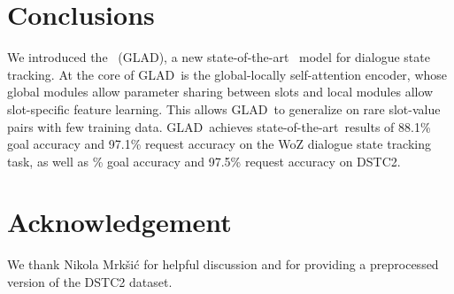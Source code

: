 \documentclass[11pt,a4paper]{article}
\newcommand{\modelnameshort}{GLAD}
\newcommand{\sota}{state-of-the-art}
\newcommand{\goalacc}{88.1}
\newcommand{\requestacc}{97.1}
\newcommand{\dstcrequestacc}{97.5}
\begin{document}
\section{Conclusions}
We introduced the \modelname~(\modelnameshort), a new \sota~ model for dialogue state tracking.
At the core of \modelnameshort~is the global-locally self-attention encoder, whose global modules allow parameter sharing between slots and local modules allow slot-specific feature learning.
This allows \modelnameshort~to generalize on rare slot-value pairs with few training data.
\modelnameshort~achieves \sota~results of \goalacc\% goal accuracy and \requestacc\% request accuracy on the WoZ dialogue state tracking task, as well as \dstcgoalacc\% goal accuracy and \dstcrequestacc\% request accuracy on DSTC2.



\section*{Acknowledgement}
We thank Nikola Mrk\v{s}i\'{c} for helpful discussion and for providing a preprocessed version of the DSTC2 dataset.




\end{document}
